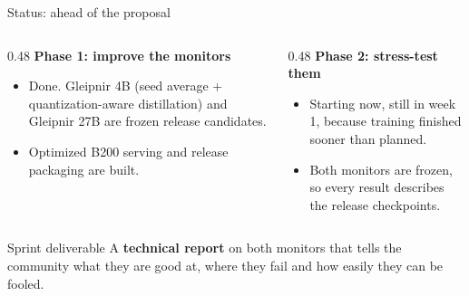 \begin{frame}{Status: ahead of the proposal}
    \begin{columns}[T,onlytextwidth]
        \begin{column}{0.48\textwidth}
            \textbf{Phase 1: improve the monitors}
            \begin{itemize}
                \item \alert{Done.} Gleipnir 4B (seed average + quantization-aware
                      distillation) and Gleipnir 27B are frozen release candidates.
                \item Optimized B200 serving and release packaging are built.
            \end{itemize}
        \end{column}
        \begin{column}{0.48\textwidth}
            \textbf{Phase 2: stress-test them}
            \begin{itemize}
                \item \alert{Starting now}, still in week 1, because training
                      finished sooner than planned.
                \item Both monitors are frozen, so every result describes the
                      release checkpoints.
            \end{itemize}
        \end{column}
    \end{columns}
    \bigskip

    \begin{block}{Sprint deliverable}
        A \textbf{technical report} on both monitors that tells the community what they
        are good at, where they fail and how easily they can be fooled.
    \end{block}
\end{frame}

